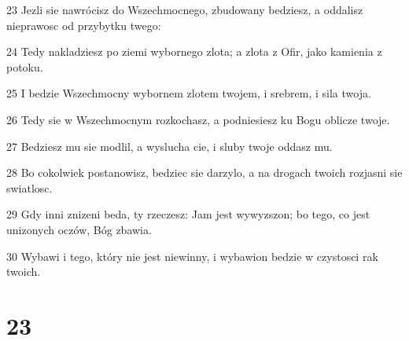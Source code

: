 \par 23 Jezli sie nawrócisz do Wszechmocnego, zbudowany bedziesz, a oddalisz nieprawosc od przybytku twego:
\par 24 Tedy nakladziesz po ziemi wybornego zlota; a zlota z Ofir, jako kamienia z potoku.
\par 25 I bedzie Wszechmocny wybornem zlotem twojem, i srebrem, i sila twoja.
\par 26 Tedy sie w Wszechmocnym rozkochasz, a podniesiesz ku Bogu oblicze twoje.
\par 27 Bedziesz mu sie modlil, a wyslucha cie, i sluby twoje oddasz mu.
\par 28 Bo cokolwiek postanowisz, bedziec sie darzylo, a na drogach twoich rozjasni sie swiatlosc.
\par 29 Gdy inni znizeni beda, ty rzeczesz: Jam jest wywyzszon; bo tego, co jest unizonych oczów, Bóg zbawia.
\par 30 Wybawi i tego, który nie jest niewinny, i wybawion bedzie w czystosci rak twoich.

\chapter{23}

